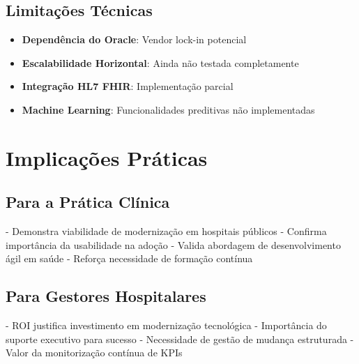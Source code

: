 \subsection{Limitações Técnicas}

\begin{itemize}
    \item \textbf{Dependência do Oracle}: Vendor lock-in potencial \cite{lin2018}
    \item \textbf{Escalabilidade Horizontal}: Ainda não testada completamente
    \item \textbf{Integração HL7 FHIR}: Implementação parcial \cite{mandl2020}
    \item \textbf{Machine Learning}: Funcionalidades preditivas não implementadas \cite{bates2021}
\end{itemize}

\section{Implicações Práticas}

\subsection{Para a Prática Clínica}

- Demonstra viabilidade de modernização em hospitais públicos
- Confirma importância da usabilidade na adoção \cite{mcgreevey2020}
- Valida abordagem de desenvolvimento ágil em saúde \cite{vaghasiya2021}
- Reforça necessidade de formação contínua \cite{kvarnstrom2023}

\subsection{Para Gestores Hospitalares}

- ROI justifica investimento em modernização tecnológica \cite{rozenblum2020}
- Importância do suporte executivo para sucesso
- Necessidade de gestão de mudança estruturada \cite{may2013}
- Valor da monitorização contínua de KPIs \cite{donabedian1988} 